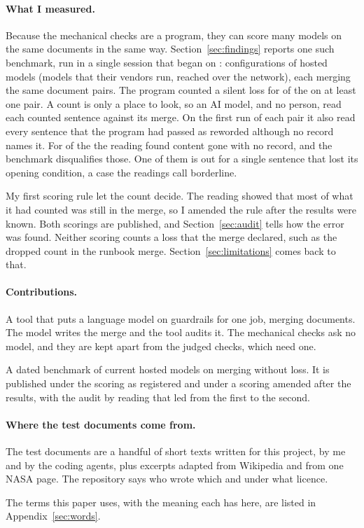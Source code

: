 \paragraph{What I measured.} Because the mechanical checks are a program, they can score many models on the same documents in the same way. Section~\ref{sec:findings} reports one such benchmark, run in a single session that began on :  configurations of hosted models (models that their vendors run, reached over the network), each merging the same  document pairs. The program counted a silent loss for  of the  on at least one pair. A count is only a place to look, so an AI model, and no person, read each counted sentence against its merge. On the first run of each pair it also read every sentence that the program had passed as reworded although no record names it. For  of the  the reading found content gone with no record, and the benchmark disqualifies those. One of them is out for a single sentence that lost its opening condition, a case the readings call borderline.

My first scoring rule let the count decide. The reading showed that most of what it had counted was still in the merge, so I amended the rule after the results were known. Both scorings are published, and Section~\ref{sec:audit} tells how the error was found. Neither scoring counts a loss that the merge declared, such as the dropped count in the runbook merge. Section~\ref{sec:limitations} comes back to that.

\paragraph{Contributions.}
\begin{points}
\item A tool that puts a language model on guardrails for one job, merging documents. The model writes the merge and the tool audits it. The mechanical checks ask no model, and they are kept apart from the judged checks, which need one.
\item A dated benchmark of current hosted models on merging without loss. It is published under the scoring as registered and under a scoring amended after the results, with the audit by reading that led from the first to the second.
\end{points}

\paragraph{Where the test documents come from.} The test documents are a handful of short texts written for this project, by me and by the coding agents, plus excerpts adapted from Wikipedia and from one NASA page. The repository says who wrote which and under what licence.

\noindent The terms this paper uses, with the meaning each has here, are listed in Appendix~\ref{sec:words}.
